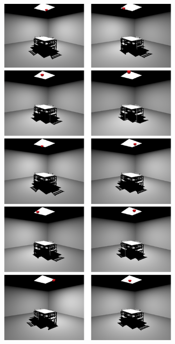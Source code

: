 \begin{figure}\label{f:instant-radiosity}
\begin{center}
	\begin{subfigure}[b]{0.38\textwidth}
		\includegraphics[width=1.0\textwidth]{graphics/ir/ir-1-1}

\end{subfigure}
\end{center}
\end{figure}
